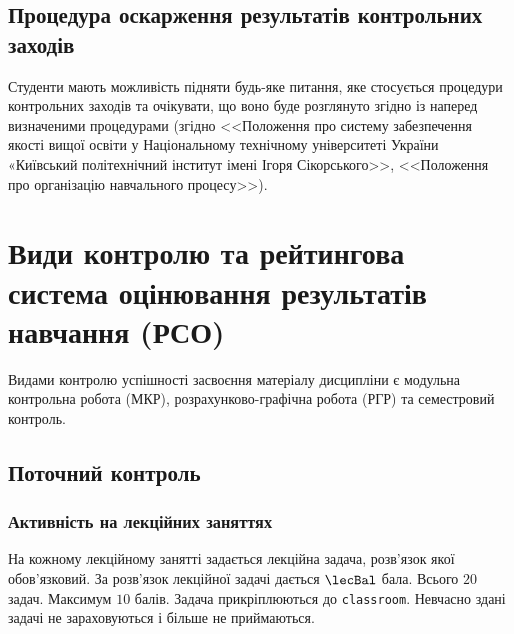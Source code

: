\documentclass{Syllabus}
\begin{document}
\subsection*{Процедура оскарження результатів контрольних заходів}

Студенти мають можливість підняти будь-яке питання, яке стосується процедури контрольних заходів та очікувати, що воно буде розглянуто згідно із наперед визначеними процедурами (згідно <<Положення про систему забезпечення якості вищої освіти у Національному технічному університеті України «Київський політехнічний інститут імені Ігоря Сікорського>>, <<Положення про організацію навчального процесу>>).

\section{Види контролю та рейтингова система оцінювання результатів навчання (РСО)}

%



Видами контролю успішності засвоєння матеріалу дисципліни є  модульна контрольна робота (МКР), розрахунково-графічна робота (РГР) та семестровий контроль.


\subsection*{Поточний контроль}

\subsubsection*{Активність на лекційних заняттях}
На кожному лекційному занятті задається лекційна задача, роз\-в'язок якої обов'язковий. За роз\-в'язок лекційної задачі дається $\lecBal$ бала. Всього $
20 $ задач. Максимум $ 10 $ балів. Задача прикріплюються до \texttt{classroom}. Невчасно здані задачі не зараховуються і більше не приймаються.
\end{document}
